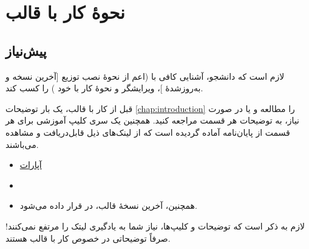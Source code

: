 \chapter{نحوۀ کار با قالب}\label{chap:introduction} %
\section{پیش‌نیاز}
لازم است که دانشجو، آشنایی کافی با
\lr{\LaTeX}
(اعم از نحوهٔ نصب توزیع
\lr{\TeX}
[آخرین نسخه و به‌روزشدهٔ
]،
ویرایشگر و نحوهٔ کار با خود
\lr{\LaTeX})
را کسب کند.

قبل از کار با قالب، یک بار توضیحات
\autoref{chap:introduction}
را مطالعه و یا در صورت نیاز، به توضیحات هر قسمت مراجعه کنید. همچنین یک سری
کلیپ آموزشی برای هر قسمت از پایان‌نامه آماده گردیده است 
که از لینک‌های ذیل قابل‌دریافت و مشاهده می‌باشند.
\begin{itemize}
	\item \href{https://www.aparat.com/Bahman_Mirzakhani/playlists}{آپارات}
	\item\href{https://www.youtube.com/channel/UCzZoLZNsM9utoqycWoG7f5A/featured}{}
	\item
	همچنین، آخرین نسخهٔ قالب، در
	\href{https://github.com/bahman-mirzakhani/znu-thesis-LaTeX-template.git}{}
	قرار داده می‌شود.
\end{itemize}

لازم به ذکر است که توضیحات و کلیپ‌ها، نیاز شما به یادگیری لیتک را مرتفع نمی‌کنند!
صرفاً توضیحاتی در خصوص کار با قالب هستند.

